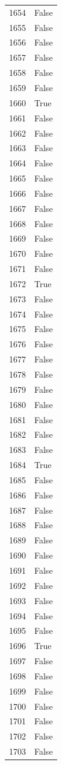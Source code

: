\documentclass[
  letterpaper,
  DIV=11,
  numbers=noendperiod]{scrreprt}
\begin{document}
\begin{tabular}{ll}
1654 &  False \\
1655 &  False \\
1656 &  False \\
1657 &  False \\
1658 &  False \\
1659 &  False \\
1660 &   True \\
1661 &  False \\
1662 &  False \\
1663 &  False \\
1664 &  False \\
1665 &  False \\
1666 &  False \\
1667 &  False \\
1668 &  False \\
1669 &  False \\
1670 &  False \\
1671 &  False \\
1672 &   True \\
1673 &  False \\
1674 &  False \\
1675 &  False \\
1676 &  False \\
1677 &  False \\
1678 &  False \\
1679 &  False \\
1680 &  False \\
1681 &  False \\
1682 &  False \\
1683 &  False \\
1684 &   True \\
1685 &  False \\
1686 &  False \\
1687 &  False \\
1688 &  False \\
1689 &  False \\
1690 &  False \\
1691 &  False \\
1692 &  False \\
1693 &  False \\
1694 &  False \\
1695 &  False \\
1696 &   True \\
1697 &  False \\
1698 &  False \\
1699 &  False \\
1700 &  False \\
1701 &  False \\
1702 &  False \\
1703 &  False \\
\bottomrule
\end{tabular}
\end{document}
